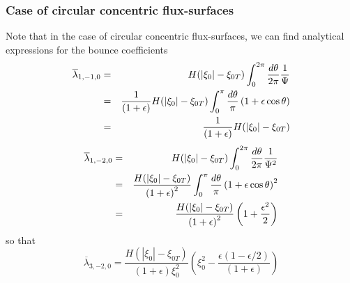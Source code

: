 \subsubsection{Case of circular concentric flux-surfaces}

Note that in the case of circular concentric flux-surfaces, we can find
analytical expressions for the bounce coefficients
\begin{eqnarray}
\overline{\lambda }_{1,-1,0} &=&H(|\xi _{0}|-\xi _{0T})\int_{0}^{2\pi }\frac{%
d\theta }{2\pi }\frac{1}{\Psi }  \nonumber \\
&=&\frac{1}{\left( 1+\epsilon \right) }H(|\xi _{0}|-\xi _{0T})\int_{0}^{\pi }%
\frac{d\theta }{\pi }\left( 1+\epsilon \cos \theta \right)  \nonumber \\
&=&\frac{1}{\left( 1+\epsilon \right) }H(|\xi _{0}|-\xi _{0T})
\end{eqnarray}
\begin{eqnarray}
\overline{\lambda }_{1,-2,0} &=&H(|\xi _{0}|-\xi _{0T})\int_{0}^{2\pi }\frac{%
d\theta }{2\pi }\frac{1}{\Psi ^{2}}  \nonumber \\
&=&\frac{H(|\xi _{0}|-\xi _{0T})}{\left( 1+\epsilon \right) ^{2}}%
\int_{0}^{\pi }\frac{d\theta }{\pi }\left( 1+\epsilon \cos \theta \right)
^{2}  \nonumber \\
&=&\frac{H(|\xi _{0}|-\xi _{0T})}{\left( 1+\epsilon \right) ^{2}}\left( 1+%
\frac{\epsilon ^{2}}{2}\right)
\end{eqnarray}
so that
\begin{equation}
\overline{\lambda }_{3,-2,0}=\frac{H(|\xi _{0}|-\xi _{0T})}{\left(
1+\epsilon \right) \xi _{0}^{2}}\left( \xi _{0}^{2}-\frac{\epsilon \left(
1-\epsilon /2\right) }{\left( 1+\epsilon \right) }\right)
\end{equation}


